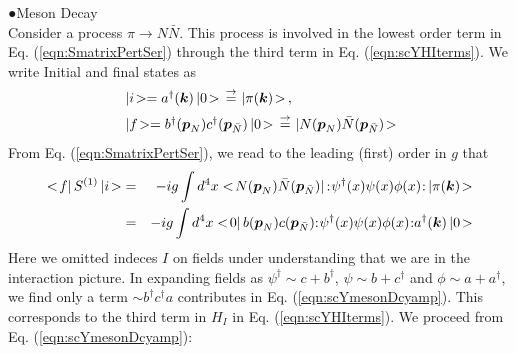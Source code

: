 \noindent
●Meson Decay\\
Consider a process $\pi \rightarrow N\bar{N}$. This process is involved in the lowest
order term in Eq. (\ref{eqn:SmatrixPertSer}) through the third term in
Eq. (\ref{eqn:scYHIterms}). We write Initial and final states as
\begin{eqnarray}
\begin{array}{l}
\ketend i \ket = a^\dagger (\bld{k}) \ketend 0 \ket
\rightdef \ketend \pi(\bld{k}) \ket\,,
\vspace{2mm}
\\
\ketend f \ket = b^\dagger (\bld{p}_N) c^\dagger (\bld{p}_{\bar{N}})\ketend 0 \ket
\rightdef \ketend N(\bld{p}_N) \bar{N}(\bld{p}_{\bar{N}}) \ket
\end{array}
\end{eqnarray}
From Eq. (\ref{eqn:SmatrixPertSer}), we read to the leading (first) order in $g$ that
\begin{eqnarray}
<\! f |\, S^{(1)} \,| i \!>
&=&
-ig \int d^4 x  
<\! N(\mbox{\boldmath $p$}_N) \bar{N}(\mbox{\boldmath $p$}_{\bar{N}}) |\,
{:\mathrel{\mspace{1mu} \psi^\dagger(x) \psi(x) \phi(x)\mspace{1mu}}:}
\,| \pi(\mbox{\boldmath $k$}) \!>
\nonumber\\
&=&
-ig \int d^4 x  
<\! 0 |\, b(\mbox{\boldmath $p$}_N) c(\mbox{\boldmath $p$}_{\bar{N}})
{:\mathrel{\mspace{1mu} \psi^\dagger(x) \psi(x) \phi(x)\mspace{1mu}}:}
 a^\dagger(\mbox{\boldmath $k$}) \,| 0 \!>
 \label{eqn:scYmesonDcyamp}
\end{eqnarray}
Here we omitted indeces $I$ on fields under understanding that we are in the interaction picture.
In expanding fields as $\psi^\dagger \sim c + b^\dagger$, 
$\psi \sim b + c^\dagger$ and $\phi \sim a + a^\dagger$,
we find only a term $\sim b^\dagger c^\dagger a$
contributes in Eq. (\ref{eqn:scYmesonDcyamp}).
This corresponds to the third term in $H_I$ in Eq. (\ref{eqn:scYHIterms}).
We proceed from Eq. (\ref{eqn:scYmesonDcyamp}):
